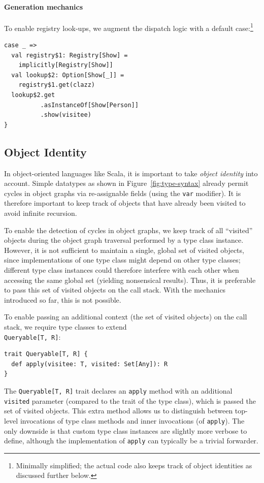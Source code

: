 \documentclass[preprint]{sigplanconf}
\begin{document}
\paragraph{Generation mechanics}

To enable registry look-ups, we augment the dispatch logic with a default
case:\footnote{Minimally simplified; the actual code also keeps track of object
identities as discussed further below.}
\begin{lstlisting}
case _ =>
  val registry$1: Registry[Show] =
    implicitly[Registry[Show]]
  val lookup$2: Option[Show[_]] =
    registry$1.get(clazz)
  lookup$2.get
          .asInstanceOf[Show[Person]]
          .show(visitee)
}
\end{lstlisting}


\subsection{Object Identity}

In object-oriented languages like Scala, it is important to take \emph{object
identity} into account. Simple datatypes as shown in
Figure~\ref{fig:type-syntax} already permit cycles in object graphs via re-assignable
fields (using the \verb|var| modifier). It is therefore important to keep
track of objects that have already been visited to avoid infinite recursion.

To enable the detection of cycles in object graphs, we keep track of all
``visited'' objects during the object graph traversal performed by a type
class instance. However, it is not sufficient to maintain a single, global set
of visited objects, since implementations of one type class might depend on
other type classes; different type class instances could therefore interfere
with each other when accessing the same global set (yielding nonsensical
results). Thus, it is preferable to pass this set of visited objects on the
call stack. With the mechanics introduced so far, this is not possible.

To enable passing an additional context (the set of visited objects) on the call stack,
we require type classes to extend \\\verb|Queryable[T, R]|:

\begin{lstlisting}
trait Queryable[T, R] {
  def apply(visitee: T, visited: Set[Any]): R
}
\end{lstlisting}
\noindent
The \verb|Queryable[T, R]| trait declares an \verb|apply| method with an
additional \verb|visited| parameter (compared to the trait of the type class),
which is passed the set of visited objects. This extra method allows us to
distinguish between top-level invocations of type class methods and inner
invocations (of \verb|apply|). The only downside is that custom type class
instances are slightly more verbose to define, although the implementation of
\verb|apply| can typically be a trivial forwarder.
\end{document}

